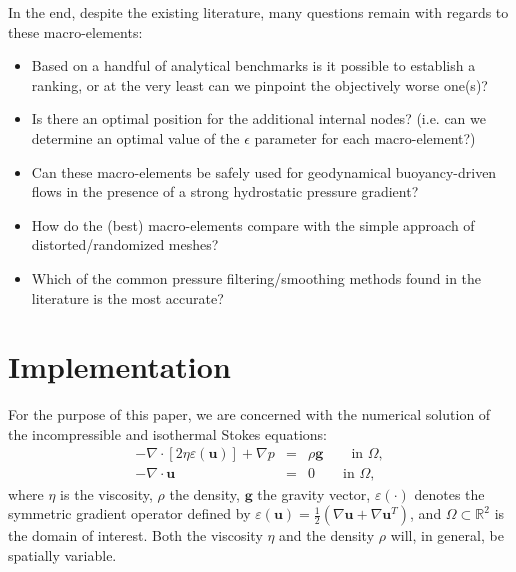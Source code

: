 \documentclass[a4paper,12pt]{article}
\begin{document}
In the end, despite the existing literature, many questions remain with regards to these macro-elements:
\begin{itemize}
\item Based on a handful of analytical benchmarks is it possible to establish a ranking, 
or at the very least can we pinpoint the objectively worse one(s)?

\item Is there an optimal position for the additional internal nodes? (i.e. can we 
determine an optimal value of the 
$\epsilon$ parameter for each macro-element?)

\item Can these macro-elements be safely used for geodynamical 
buoyancy-driven flows in the presence of a strong hydrostatic pressure gradient?

\item How do the (best) macro-elements compare with the simple approach of 
distorted/randomized meshes?

\item Which of the common pressure filtering/smoothing methods found in the literature is the most accurate?
\end{itemize}











\section{Implementation}


For the purpose of this paper, we are concerned with the numerical solution of 
the incompressible and isothermal Stokes equations:
\begin{eqnarray}
-\nabla \cdot \left[ 2\eta \varepsilon({\bm u}) \right] + \nabla p &=& \rho \bm g \qquad  \textrm{in $\Omega$},
\label{eq:conv_momentum}  \\  
-\nabla \cdot {\bm u} &=& 0    \qquad    \textrm{in $\Omega$},   \label{eq:conv_mass} 
\end{eqnarray}
where $\eta$ is the viscosity, $\rho$ the density, ${\bm g}$ the gravity vector, $\varepsilon(\cdot)$
denotes the symmetric gradient operator defined by $\varepsilon({\bm u})
=\frac 12 (\nabla {\bm u} + \nabla {\bm u}^{T})$, 
and $\Omega\subset{\mathbb R}^2$ is the domain
of interest. Both the viscosity $\eta$
and the density $\rho$ will, in general, be spatially variable.
\end{document}
